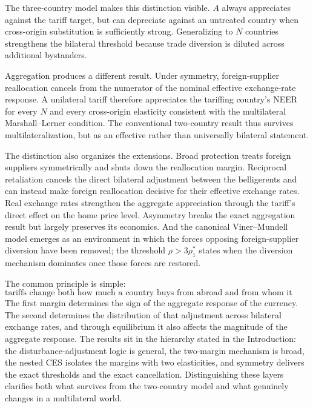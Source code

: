 \documentclass[11pt]{article}
\begin{document}
The three-country model makes this distinction visible. $A$ always appreciates against the tariff target, but can depreciate against an untreated country when cross-origin substitution is sufficiently strong. Generalizing to $N$ countries strengthens the bilateral threshold because trade diversion is diluted across additional bystanders.

Aggregation produces a different result. Under symmetry, foreign-supplier reallocation cancels from the numerator of the nominal effective exchange-rate response. A unilateral tariff therefore appreciates the tariffing country's NEER for every $N$ and every cross-origin elasticity consistent with the multilateral Marshall--Lerner condition. The conventional two-country result thus survives multilateralization, but as an effective rather than universally bilateral statement.

The distinction also organizes the extensions. Broad protection treats foreign suppliers symmetrically and shuts down the reallocation margin. Reciprocal retaliation cancels the direct bilateral adjustment between the belligerents and can instead make foreign reallocation decisive for their effective exchange rates. Real exchange rates strengthen the aggregate appreciation through the tariff's direct effect on the home price level. Asymmetry breaks the exact aggregation result but largely preserves its economics. And the canonical Viner--Mundell model emerges as an environment in which the forces opposing foreign-supplier diversion have been removed; the threshold $\rho > 3\rho_1^*$ states when the diversion mechanism dominates once those forces are restored.

The common principle is simple:
\[
\boxed{\text{tariffs change both how much a country buys from abroad and from whom it buys it.}}
\]
The first margin determines the sign of the aggregate response of the currency. The second determines the distribution of that adjustment across bilateral exchange rates, and through equilibrium it also affects the magnitude of the aggregate response. The results sit in the hierarchy stated in the Introduction: the disturbance-adjustment logic is general, the two-margin mechanism is broad, the nested CES isolates the margins with two elasticities, and symmetry delivers the exact thresholds and the exact cancellation. Distinguishing these layers clarifies both what survives from the two-country model and what genuinely changes in a multilateral world.
\end{document}
